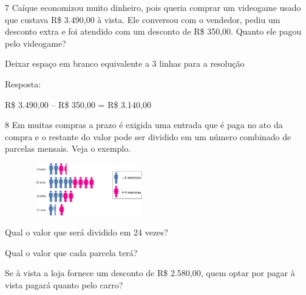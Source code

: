 \begin{escolha}
{

\num{7} Caíque economizou muito dinheiro, pois queria comprar um videogame usado
que custava R\$ 3.490,00 à vista. Ele conversou com o vendedor, pediu
um desconto extra e foi atendido com um desconto de R\$ 350,00. Quanto ele pagou pelo videogame?

Deixar espaço em branco equivalente a 3 linhas para a resolução

Resposta:

R\$ 3.490,00 -- R\$ 350,00 = R\$ 3.140,00

\num{8} Em muitas compras a prazo é exigida uma entrada que é paga no ato da
compra e o restante do valor pode ser dividido em um número combinado de
parcelas mensais. Veja o exemplo.

\includegraphics[width=2.90025in,height=0.89174in]{media/image76.png}


\begin{escolha}

\item
  Qual o valor que será dividido em 24 vezes?

\item
  Qual o valor que cada parcela terá?

\item
  Se à vista a loja fornece um desconto de R\$ 2.580,00, quem optar por
  pagar à vista pagará quanto pelo carro?
\end{escolha}

}
\end{escolha}
